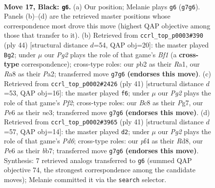 \documentclass[11pt]{article}
\begin{document}
\clearpage

\begin{figure}[p]\centering
\begin{subfigure}{0.46\textwidth}\centering
\resizebox{\linewidth}{!}{%
\newchessgame
\chessboard[
  setfen={r1b2b1N/2k3pp/2p1pn2/p1P5/5P1P/4P3/PP6/RNB3K1 b - - 0 17},
  showmover=false,
  pgfstyle=straightmove, color=movearrow, markmove={g7-g6}
]}
\caption{}
\end{subfigure}\hfill
\begin{subfigure}{0.46\textwidth}\centering
\resizebox{\linewidth}{!}{%
\newchessgame
\chessboard[
  setfen={r1b5/2pp1k2/pp2p1np/8/2P2P1P/4P3/PP1N4/R3KB2 w Q - 0 23},
  showmover=false,
  pgfstyle=straightmove, color=movearrow, markmove={f1-g2}
]}
\caption{}
\end{subfigure}
\\[4pt]
\begin{subfigure}{0.46\textwidth}\centering
\resizebox{\linewidth}{!}{%
\newchessgame
\chessboard[
  setfen={3r2k1/p4ppp/2n1b3/1p6/5P2/2P1N3/P3PP1P/R1B3K1 b - - 0 21},
  showmover=false,
  pgfstyle=straightmove, color=movearrow, markmove={f7-f6}
]}
\caption{}
\end{subfigure}\hfill
\begin{subfigure}{0.46\textwidth}\centering
\resizebox{\linewidth}{!}{%
\newchessgame
\chessboard[
  setfen={3r4/pB4bk/6pp/5b2/8/N1Pp3P/PP3PP1/R5K1 b - - 0 21},
  showmover=false,
  pgfstyle=straightmove, color=movearrow, markmove={d3-d2}
]}
\caption{}
\end{subfigure}
\caption{\textbf{Move 17, Black: \texttt{g6}.} (a) Our position; Melanie plays \texttt{g6} (\texttt{g7g6}). Panels (b)--(d) are the retrieved master positions whose correspondence most drove this move (highest QAP objective among those that transfer to it). (b) Retrieved from \texttt{ccrl\_top\_p0003\#390} (ply 44) [structural distance $d$=54, QAP obj=20]: the master played \texttt{Bg2}; under $\mu$ our \emph{Pg2} plays the role of that game's \emph{Bf1} (a \textbf{cross-type} correspondence); cross-type roles: our \emph{p}b2 as their \emph{R}a1, our \emph{R}a8 as their \emph{P}a2; transferred move \texttt{g7g6} \textbf{(endorses this move)}. (c) Retrieved from \texttt{ccrl\_top\_p0002\#2426} (ply 41) [structural distance $d$=53, QAP obj=16]: the master played \texttt{f6}; under $\mu$ our \emph{Pg2} plays the role of that game's \emph{Pf2}; cross-type roles: our \emph{B}c8 as their \emph{P}g7, our \emph{P}e6 as their \emph{n}e3; transferred move \texttt{g7g6} \textbf{(endorses this move)}. (d) Retrieved from \texttt{ccrl\_top\_p0002\#3965} (ply 41) [structural distance $d$=57, QAP obj=14]: the master played \texttt{d2}; under $\mu$ our \emph{Pg2} plays the role of that game's \emph{Pd6}; cross-type roles: our \emph{p}f4 as their \emph{R}d8, our \emph{P}e6 as their \emph{b}b7; transferred move \texttt{g7g6} \textbf{(endorses this move)}. Synthesis: 7 retrieved analogs transferred to \texttt{g6} (summed QAP objective 74, the strongest correspondence among the candidate moves); Melanie committed it via the \texttt{search} selector.}
\label{fig:thought-m33}
\end{figure}
\end{document}
